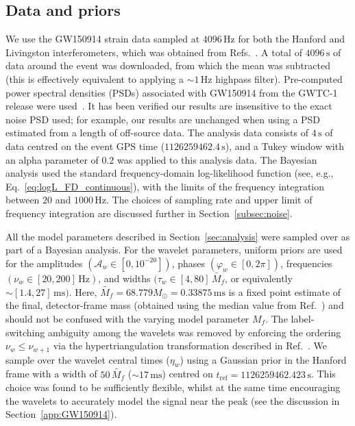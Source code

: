 \subsection{Data and priors}
\label{sec:details}

We use the GW150914 strain data sampled at $4096\, \mathrm{Hz}$ for both the Hanford and Livingston interferometers, which was obtained from Refs.~\cite{gwosc, LIGOScientific:2019lzm}.
A total of $4096\,\mathrm{s}$ of data around the event was downloaded, from which the mean was subtracted (this is effectively equivalent to applying a $\sim 1\, \mathrm{Hz}$ highpass filter). 
Pre-computed power spectral densities (PSDs) associated with GW150914 from the GWTC-1 release were used~\cite{gwtc1psds}. 
It has been verified our results are insensitive to the exact noise PSD used; for example, our results are unchanged when using a PSD estimated from a length of off-source data.
The analysis data consists of $4\,\mathrm{s}$ of data centred on the event GPS time ($1126259462.4\,\mathrm{s}$), and a Tukey window with an alpha parameter of 0.2 was applied to this analysis data.
The Bayesian analysis used the standard frequency-domain log-likelihood function (see, e.g., Eq.~\ref{eq:logL_FD_continuous}), with the limits of the frequency integration between $20$ and $1000\, \mathrm{Hz}$.
The choices of sampling rate and upper limit of frequency integration are discussed further in Section~\ref{subsec:noise}.

All the model parameters described in Section~\ref{sec:analysis} were sampled over as part of a Bayesian analysis.
For the wavelet parameters, uniform priors are used for the amplitudes $(\mathcal{A}_w \in [0,10^{-20}])$, phases $(\varphi_w \in [0,2\pi])$, frequencies $(\nu_w \in [20,200]\, \mathrm{Hz})$, and widths $(\tau_w \in [4,80]\, \tilde{M_f}$, or equivalently $\sim[1.4,27]\, \mathrm{ms})$.
Here, $\tilde{M_f}=68.779M_\odot=0.33875\,\mathrm{ms}$ is a fixed point estimate of the final, detector-frame mass (obtained using the median value from Ref.~\cite{LIGOScientific:2018mvr}) and should not be confused with the varying model parameter $M_f$.
The label-switching ambiguity among the wavelets was removed by enforcing the ordering 
$ \nu_w \leq \nu_{w+1} $ via the hypertriangulation transformation described in Ref.~\cite{Buscicchio:2019rir}.
We sample over the wavelet central times ($\eta_w$) using a Gaussian prior in the Hanford frame with a width of $50\,\tilde{M_f}$ ($\sim 17\,\mathrm{ms}$) centred on $t_\mathrm{ref} = 1126259462.423\,\mathrm{s}$.
This choice was found to be sufficiently flexible, whilst at the same time encouraging the wavelets to accurately model the signal near the peak (see the discussion in Section~\ref{app:GW150914}).

